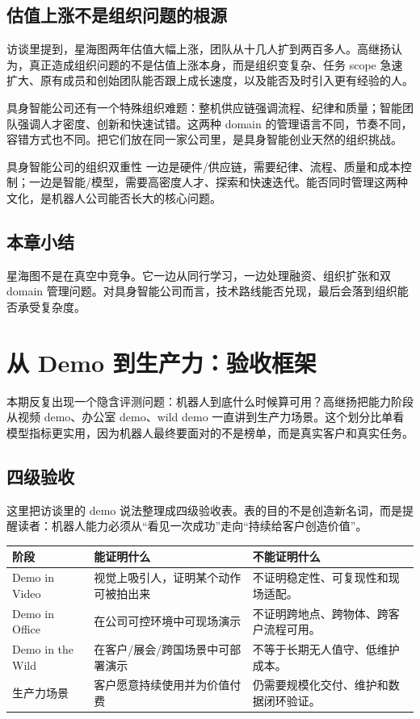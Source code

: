 \documentclass[a4paper]{article}
\begin{document}
\subsection{估值上涨不是组织问题的根源}

访谈里提到，星海图两年估值大幅上涨，团队从十几人扩到两百多人。高继扬认为，真正造成组织问题的不是估值上涨本身，而是组织变复杂、任务 scope 急速扩大、原有成员和创始团队能否跟上成长速度，以及能否及时引入更有经验的人。

具身智能公司还有一个特殊组织难题：整机供应链强调流程、纪律和质量；智能团队强调人才密度、创新和快速试错。这两种 domain 的管理语言不同，节奏不同，容错方式也不同。把它们放在同一家公司里，是具身智能创业天然的组织挑战。

\begin{importantbox}{具身智能公司的组织双重性}
一边是硬件/供应链，需要纪律、流程、质量和成本控制；一边是智能/模型，需要高密度人才、探索和快速迭代。能否同时管理这两种文化，是机器人公司能否长大的核心问题。
\end{importantbox}

\subsection{本章小结}

星海图不是在真空中竞争。它一边从同行学习，一边处理融资、组织扩张和双 domain 管理问题。对具身智能公司而言，技术路线能否兑现，最后会落到组织能否承受复杂度。

\section{从 Demo 到生产力：验收框架}

本期反复出现一个隐含评测问题：机器人到底什么时候算可用？高继扬把能力阶段从视频 demo、办公室 demo、wild demo 一直讲到生产力场景。这个划分比单看模型指标更实用，因为机器人最终要面对的不是榜单，而是真实客户和真实任务。

\subsection{四级验收}

这里把访谈里的 demo 说法整理成四级验收表。表的目的不是创造新名词，而是提醒读者：机器人能力必须从“看见一次成功”走向“持续给客户创造价值”。

\begin{longtable}{p{}p{}p{}}
\toprule
阶段 & 能证明什么 & 不能证明什么 \\
\midrule
Demo in Video & 视觉上吸引人，证明某个动作可被拍出来 & 不证明稳定性、可复现性和现场适配。 \\
Demo in Office & 在公司可控环境中可现场演示 & 不证明跨地点、跨物体、跨客户流程可用。 \\
Demo in the Wild & 在客户/展会/跨国场景中可部署演示 & 不等于长期无人值守、低维护成本。 \\
生产力场景 & 客户愿意持续使用并为价值付费 & 仍需要规模化交付、维护和数据闭环验证。 \\
\bottomrule
\end{longtable}
\end{document}

